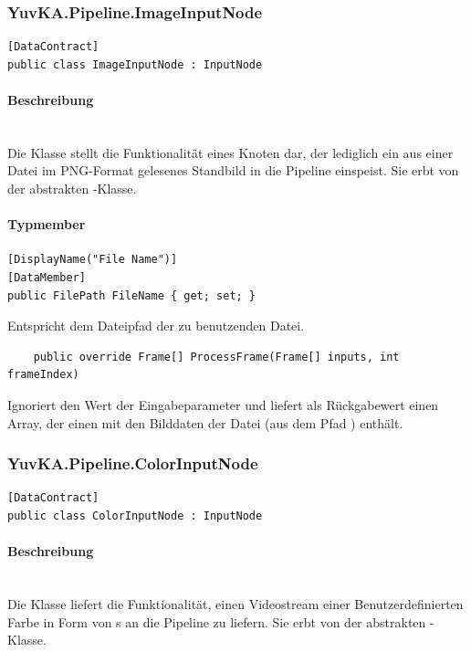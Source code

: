 \subsubsection{YuvKA.Pipeline.ImageInputNode}

\begin{verbatim}
[DataContract]
public class ImageInputNode : InputNode
\end{verbatim}

\paragraph{Beschreibung}~\\
Die Klasse  stellt die Funktionalität eines Knoten dar, der lediglich ein aus einer Datei im PNG-Format gelesenes Standbild in die Pipeline einspeist. Sie erbt von der abstrakten -Klasse.

\paragraph{Typmember}
\begin{itemize}

	\begin{verbatim}
[DisplayName("File Name")]
[DataMember]
public FilePath FileName { get; set; }
	\end{verbatim}
	Entspricht dem Dateipfad der zu benutzenden Datei.

	\begin{verbatim}
	public override Frame[] ProcessFrame(Frame[] inputs, int frameIndex)
	\end{verbatim}
	Ignoriert den Wert der Eingabeparameter und liefert als Rückgabewert einen Array, der einen  mit den Bilddaten der Datei (aus dem Pfad ) enthält.

\end{itemize}
\subsubsection{YuvKA.Pipeline.ColorInputNode}

\begin{verbatim}
[DataContract]
public class ColorInputNode : InputNode
\end{verbatim}

\paragraph{Beschreibung}~\\
Die Klasse  liefert die Funktionalität, einen Videostream einer Benutzerdefinierten Farbe in Form von s an die Pipeline zu liefern. Sie erbt von der abstrakten -Klasse.


